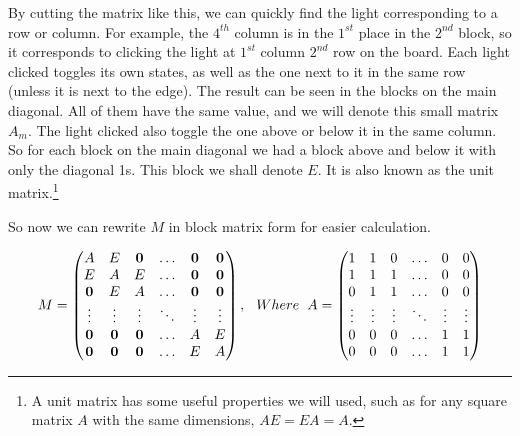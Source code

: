 \documentclass[a4paper, 12pt]{article}
\begin{document}
By cutting the matrix like this, we can quickly find the light corresponding to a row or column. For example, the $4^{th}$ column is in the $1^{st}$ place in the $2^{nd}$ block, so it corresponds to clicking the light at $1^{st}$ column $2^{nd}$ row on the board. Each light clicked toggles its own states, as well as the one next to it in the same row (unless it is next to the edge). The result can be seen in the blocks on the main diagonal. All of them have the same value, and we will denote this small matrix $A_m$. The light clicked also toggle the one above or below it in the same column. So for each block on the main diagonal we had a block above and below it with only the diagonal 1s. This block we shall denote $E$. It is also known as the unit matrix.\footnote{A unit matrix has some useful properties we will used, such as for any square matrix $A$ with the same dimensions, $AE=EA=A$.}

So now we can rewrite $M$ in block matrix form for easier calculation.
\begin{singlespace}
\begin{equation*}
M=
\begin{pmatrix}
A&E&\textbf{0}&\hdots&\textbf{0}&\textbf{0}\\
E&A&E&\hdots&\textbf{0}&\textbf{0}\\
\textbf{0}&E&A&\hdots&\textbf{0}&\textbf{0}\\
\vdots&\vdots&\vdots&\ddots&\vdots&\vdots\\
\textbf{0}&\textbf{0}&\textbf{0}&\hdots&A&E\\
\textbf{0}&\textbf{0}&\textbf{0}&\hdots&E&A
\end{pmatrix}, \hspace{0.25cm}
Where\hspace{0.2cm} A =
\begin{pmatrix}
1&1&0&\hdots&0&0\\
1&1&1&\hdots&0&0\\
0&1&1&\hdots&0&0\\
\vdots&\vdots&\vdots&\ddots&\vdots&\vdots\\
0&0&0&\hdots&1&1\\
0&0&0&\hdots&1&1
\end{pmatrix}
\end{equation*}
\end{singlespace}
\end{document}
